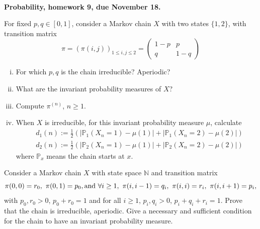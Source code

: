 \documentclass[11pt,reqno]{amsart}
\renewcommand{\P}{{\mathbb{P}}}
\newcommand{\1}{\mathds{1}}
\theoremstyle{definition}
\theoremstyle{remark}
\numberwithin{equation}{section}
\begin{document}
~\vspace{-1cm}



\begin{center}
{\bf Probability, homework 9, due November 18.}
\end{center}
\vspace{0.5cm}
\small







 For fixed $p,q\in[0,1]$,  consider a Markov chain $X$ with two states $\{1,2\}$, with transition matrix
$$
\pi=(\pi(i,j))_{1\leq i,j\leq 2}=\left(
\begin{array}{cc}
1-p&p\\
q&1-q
\end{array}
\right)
$$
\begin{enumerate}[(i)]
\item For which $p,q$ is the chain irreducible? Aperiodic?
\item What are the invariant probability measures of $X$?
\item Compute $\pi^{(n)}$, $n\geq 1$.
\item When $X$ is irreducible,  for this invariant probability measure $\mu$, calculate
\begin{align*}
&d_1(n):=\frac{1}{2}\left(|\P_1(X_n=1)-\mu(1)|+|\P_1(X_n=2)-\mu(2)|\right)\\
&d_2(n):=\frac{1}{2}\left(|\P_2(X_n=1)-\mu(1)|+|\P_2(X_n=2)-\mu(2)|\right)
\end{align*}
where $\P_x$ means the chain starts at $x$.
\end{enumerate}



 Consider a Markov chain $X$ with state space $\mathbb{N}$ and transition matrix 
$$
\pi(0,0)=r_0,\ \pi(0,1)=p_0,  {\rm and}\ \forall i\geq 1,\ \pi(i,i-1)=q_i,\ \pi(i,i)=r_i,\ \pi(i,i+1)=p_i,
$$
with $p_0,r_0>0$, $p_0+r_0=1$ and for all $i\geq 1$, $p_i,q_i>0$, $p_i+q_i+r_i=1$. 
Prove that the chain is irreducible, aperiodic.  Give a necessary and sufficient condition for the chain to have an invariant probability measure.\\
\end{document}
